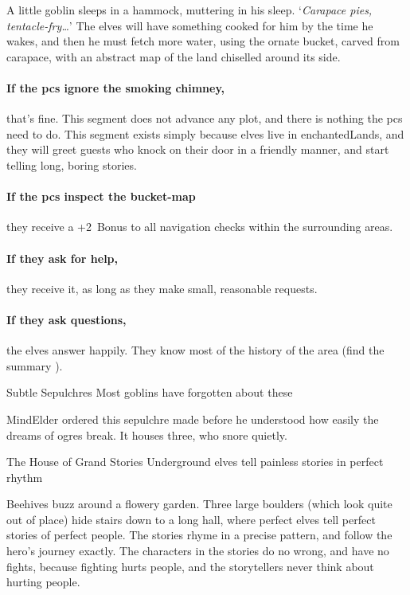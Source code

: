 \begin{multicols}{2}
A little goblin sleeps in a hammock, muttering in his sleep.
`\textit{Carapace pies, tentacle-fry\ldots}'
The elves will have something cooked for him by the time he wakes, and then he must fetch more water, using the ornate bucket, carved from carapace, with an abstract map of the land chiselled around its side.

\elf

\paragraph{If the \glspl{pc} ignore the smoking chimney,}
that's fine.
This \gls{segment} does not advance any plot, and there is nothing the \glspl{pc} need to do.
This \gls{segment} exists simply because elves live in \gls{enchantedLands}, and they will greet guests who knock on their door in a friendly manner, and start telling long, boring stories.

\paragraph{If the \glspl{pc} inspect the bucket-map}
they receive a +2~Bonus to all \gls{navigation} checks within the surrounding \glspl{area}.

\paragraph{If they ask for help,}
they receive it, as long as they make small, reasonable requests.

\paragraph{If they ask questions,}
the elves answer happily.
They know most of the history of the area (find the summary ).

{Subtle Sepulchres}%
{Most goblins have forgotten about these }%

\Gls{MindElder} ordered this sepulchre made before he understood how easily the dreams of \glspl{ogre} break.
It houses three, who snore quietly.

{The House of Grand Stories}%
{Underground elves tell painless stories in perfect rhythm}%

Beehives buzz around a flowery garden.
Three large boulders (which look quite out of place) hide stairs down to a long hall, where perfect elves tell perfect stories of perfect people.
The stories rhyme in a precise pattern, and follow the hero's journey exactly.
The characters in the stories do no wrong, and have no fights, because fighting hurts people, and the storytellers never think about hurting people.


\end{multicols}
